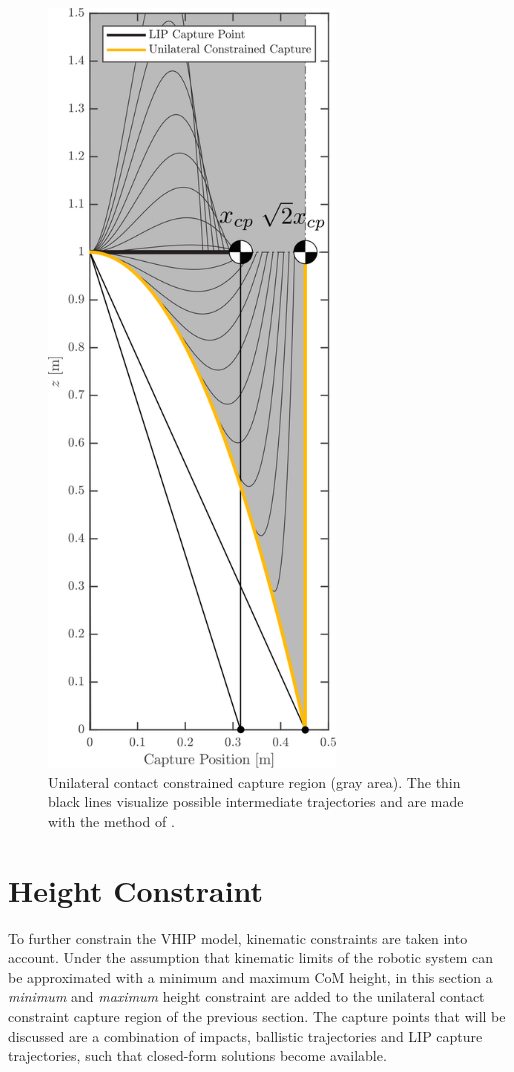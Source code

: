 \begin{figure}
\centering
\includegraphics[width=3.0in]{STYLESTUFF/CPvsBalistic3.png}
\caption{Unilateral contact constrained capture region (gray area). The thin black lines visualize possible intermediate trajectories and are made with the method of \cite{koolen2016balance}.}
\label{fig:cpbal}
\end{figure}

\section{Height Constraint}
To further constrain the \ac{VHIP} model, kinematic constraints are taken into account. Under the assumption that kinematic limits of the robotic system can be approximated with a minimum and maximum \ac{CoM} height, in this section a \textit{minimum} and \textit{maximum} height constraint are added to the unilateral contact constraint capture region of the previous section. The capture points that will be discussed are a combination of impacts, ballistic trajectories and \ac{LIP} capture trajectories, such that closed-form solutions become available. 

